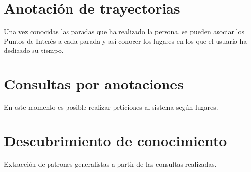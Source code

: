 \section{Anotación de trayectorias}

Una vez conocidas las paradas que ha realizado la persona, se pueden asociar los Puntos de Interés a cada parada y así conocer los lugares en los que el usuario ha dedicado su tiempo.


\section{Consultas por anotaciones}

En este momento es posible realizar peticiones al sistema según lugares.


\section{Descubrimiento de conocimiento}

Extracción de patrones generalistas  a partir de las consultas realizadas.